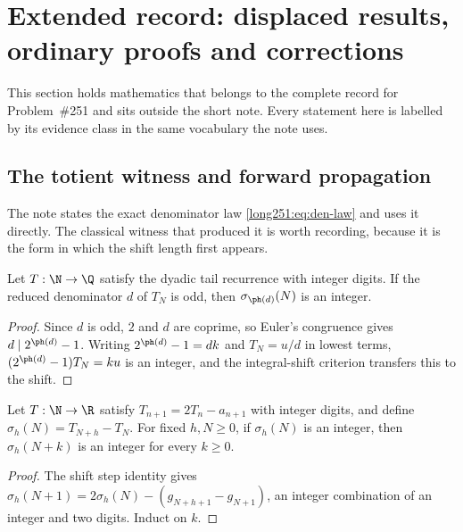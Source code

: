 \clearpage
\section{Extended record: displaced results, ordinary proofs and corrections}
\label{long251:sec:erdos-251-extended-record}

This section holds mathematics that belongs to the complete record for
Problem~\#251 and sits outside the short note.  Every statement here is
labelled by its evidence class in the same vocabulary the note uses.

\subsection{The totient witness and forward propagation}
\label{long251:sec:xr-totient}

The note states the exact denominator law \eqref{long251:eq:den-law} and uses it
directly.  The classical witness that produced it is worth recording, because
it is the form in which the shift length first appears.

\begin{proposition}\label{long251:xr:totient}
Let $T:\N\to\Q$ satisfy the dyadic tail recurrence with integer digits.  If the
reduced denominator $d$ of $T_N$ is odd, then $\sigma_{\ph(d)}(N)$ is an
integer.
\end{proposition}

\begin{proof}
Since $d$ is odd, $2$ and $d$ are coprime, so Euler's congruence gives
$d\mid2^{\ph(d)}-1$.  Writing $2^{\ph(d)}-1=dk$ and $T_N=u/d$ in lowest terms,
$(2^{\ph(d)}-1)T_N=ku$ is an integer, and the integral-shift criterion
transfers this to the shift.
\end{proof}

\begin{proposition}[propagation]\label{long251:xr:propagate}
Let $T:\N\to\R$ satisfy $T_{n+1}=2T_n-a_{n+1}$ with integer digits,
and define $\sigma_h(N)=T_{N+h}-T_N$.  For fixed $h,N\ge0$,
if $\sigma_h(N)$ is an integer, then $\sigma_h(N+k)$ is an integer
for every $k\ge0$.
\end{proposition}

\begin{proof}
The shift step identity gives
$\sigma_h(N+1)=2\sigma_h(N)-(g_{N+h+1}-g_{N+1})$, an integer combination of an
integer and two digits.  Induct on $k$.
\end{proof}

